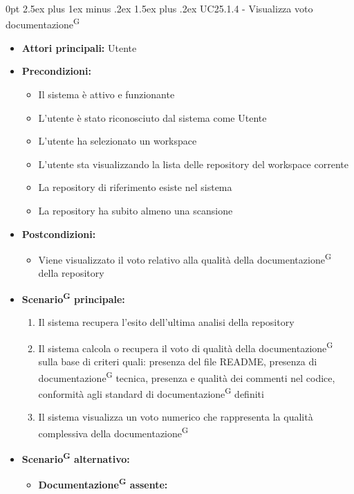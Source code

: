 \documentclass[a4paper, 11pt]{article}
\makeatletter
\renewcommand\paragraph{\@startsection{paragraph}{4}
  {0pt}
  {2.5ex plus 1ex minus .2ex}
  {1.5ex plus .2ex}
  {\normalfont\normalsize\bfseries\color{AccentDark}}}
\makeatother
\begin{document}
\paragraph{UC25.1.4 - Visualizza voto documentazione\textsuperscript{G}} \label{UC25.1.4}
\begin{itemize}
	\item \textbf{Attori principali:} Utente
	\item \textbf{Precondizioni:} 
	\begin{itemize}
		\item Il sistema è attivo e funzionante
		\item L'utente è stato riconosciuto dal sistema come Utente
		\item L'utente ha selezionato un workspace 
		\item L'utente sta visualizzando la lista delle repository del workspace corrente
		\item La repository di riferimento esiste nel sistema
		\item La repository ha subito almeno una scansione
	\end{itemize}
	\item \textbf{Postcondizioni:} 
	\begin{itemize}
		\item Viene visualizzato il voto relativo alla qualità della documentazione\textsuperscript{G} della repository
	\end{itemize}
	\item \textbf{Scenario\textsuperscript{G} principale:}
	\begin{enumerate}
		\item Il sistema recupera l'esito dell'ultima analisi della repository
		\item Il sistema calcola o recupera il voto di qualità della documentazione\textsuperscript{G} sulla base di criteri quali: presenza del file README, presenza di documentazione\textsuperscript{G} tecnica, presenza e qualità dei commenti nel codice, conformità agli standard di documentazione\textsuperscript{G} definiti 
		\item Il sistema visualizza un voto numerico che rappresenta la qualità complessiva della documentazione\textsuperscript{G}
	\end{enumerate}
	\item \textbf{Scenario\textsuperscript{G} alternativo:}
	\begin{itemize}
		\item \textbf{Documentazione\textsuperscript{G} assente:} 

\end{itemize}
\end{itemize}
\end{document}
